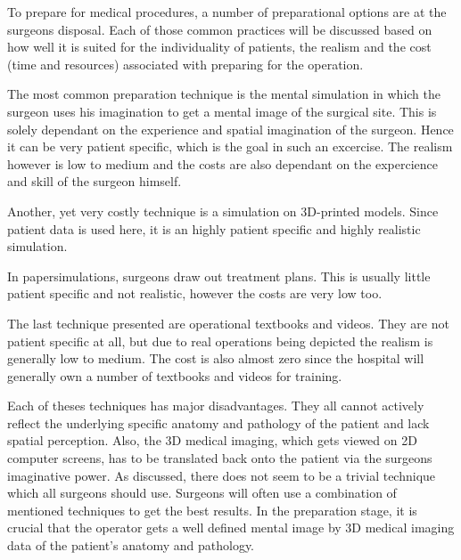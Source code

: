 To prepare for medical procedures, a number of preparational options are at the surgeons disposal.
Each of those common practices will be discussed based on how well it is suited for the individuality of patients, the realism and the cost (time and resources) associated with preparing for the operation.

The most common preparation technique is the mental simulation in which the surgeon uses his imagination to get a mental image of the surgical site.
This is solely dependant on the experience and spatial imagination of the surgeon. 
Hence it can be very patient specific, which is the goal in such an excercise.
The realism however is low to medium and the costs are also dependant on the expercience and skill of the surgeon himself.

Another, yet very costly technique is a simulation on 3D-printed models.
Since patient data is used here, it is an highly patient specific and highly realistic simulation.

In papersimulations, surgeons draw out treatment plans.
This is usually little patient specific and not realistic, however the costs are very low too.

The last technique presented are operational textbooks and videos.
They are not patient specific at all, but due to real operations being depicted the realism is generally low to medium.
The cost is also almost zero since the hospital will generally own a number of textbooks and videos for training.

Each of theses techniques has major disadvantages.
They all cannot actively reflect the underlying specific anatomy and pathology of the patient and lack spatial perception.
Also, the 3D medical imaging, which gets viewed on 2D computer screens, has to be translated back onto the patient via the surgeons imaginative power. 
As discussed, there does not seem to be a trivial technique which all surgeons should use.
Surgeons will often use a combination of mentioned techniques to get the best results.
In the preparation stage, it is crucial that the operator gets a well defined mental image by 3D medical imaging data of the patient's anatomy and pathology.
